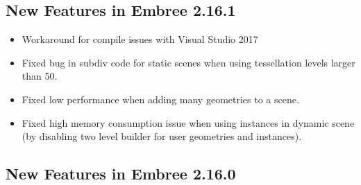 \subsection{New Features in Embree
2.16.1}\label{new-features-in-embree-2.16.1}

\begin{itemize}
\tightlist
\item
  Workaround for compile issues with Visual Studio 2017
\item
  Fixed bug in subdiv code for static scenes when using tessellation
  levels larger than 50.
\item
  Fixed low performance when adding many geometries to a scene.
\item
  Fixed high memory consumption issue when using instances in dynamic
  scene (by disabling two level builder for user geometries and
  instances).
\end{itemize}

\subsection{New Features in Embree
2.16.0}\label{new-features-in-embree-2.16.0}


